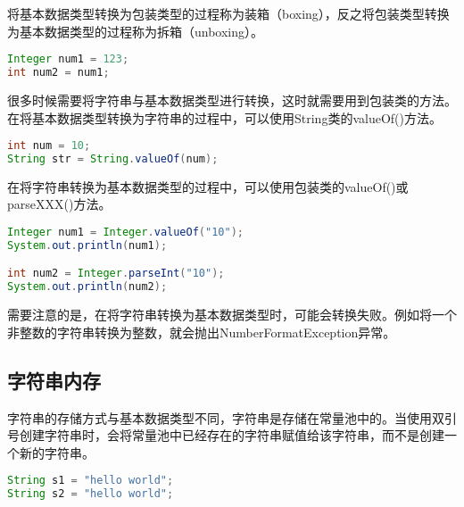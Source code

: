 将基本数据类型转换为包装类型的过程称为装箱（boxing），反之将包装类型转换为基本数据类型的过程称为拆箱（unboxing）。

\vspace{-0.5cm}

\begin{lstlisting}[language=Java]
Integer num1 = 123;
int num2 = num1;
\end{lstlisting}

很多时候需要将字符串与基本数据类型进行转换，这时就需要用到包装类的方法。\\

在将基本数据类型转换为字符串的过程中，可以使用String类的valueOf()方法。

\vspace{-0.5cm}

\begin{lstlisting}[language=Java]
int num = 10;
String str = String.valueOf(num);
\end{lstlisting}

在将字符串转换为基本数据类型的过程中，可以使用包装类的valueOf()或parseXXX()方法。

\vspace{-0.5cm}

\begin{lstlisting}[language=Java]
Integer num1 = Integer.valueOf("10");
System.out.println(num1);

int num2 = Integer.parseInt("10");
System.out.println(num2);
\end{lstlisting}

需要注意的是，在将字符串转换为基本数据类型时，可能会转换失败。例如将一个非整数的字符串转换为整数，就会抛出NumberFormatException异常。\\

\subsection{字符串内存}

字符串的存储方式与基本数据类型不同，字符串是存储在常量池中的。当使用双引号创建字符串时，会将常量池中已经存在的字符串赋值给该字符串，而不是创建一个新的字符串。

\vspace{-0.5cm}

\begin{lstlisting}[language=Java]
String s1 = "hello world";
String s2 = "hello world";
\end{lstlisting}

\begin{figure}[H]
	\centering
\end{figure}

